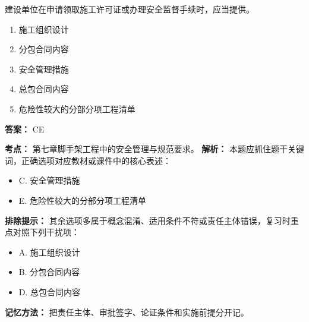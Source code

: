 \documentclass[UTF8,fontset=fandol,11pt]{ctexart}
\begin{document}
\begin{quizbox}[title={第 2 题}]
建设单位在申请领取施工许可证或办理安全监督手续时，应当提供。\\
\begin{enumerate}[label=\Alph*.]
\item 施工组织设计
\item 分包合同内容
\item 安全管理措施
\item 总包合同内容
\item 危险性较大的分部分项工程清单
\end{enumerate}
\textbf{答案：} CE
\vspace{0.25em}
\begin{answerbox}[title={考点解析}]
\textbf{考点：} 第七章脚手架工程中的安全管理与规范要求。
\textbf{解析：} 本题应抓住题干关键词，正确选项对应教材或课件中的核心表述：
\begin{itemize}
\item C. 安全管理措施
\item E. 危险性较大的分部分项工程清单
\end{itemize}
\textbf{排除提示：} 其余选项多属于概念混淆、适用条件不符或责任主体错误，复习时重点对照下列干扰项：
\begin{itemize}
\item A. 施工组织设计
\item B. 分包合同内容
\item D. 总包合同内容
\end{itemize}
\textbf{记忆方法：} 把责任主体、审批签字、论证条件和实施前提分开记。
\end{answerbox}
\end{quizbox}
\end{document}

